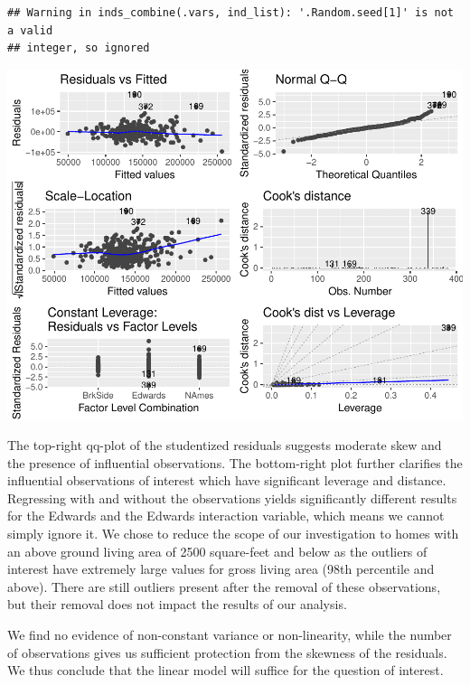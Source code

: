 \documentclass[american,]{article}
\begin{document}
\begin{verbatim}
## Warning in inds_combine(.vars, ind_list): '.Random.seed[1]' is not a valid
## integer, so ignored
\end{verbatim}

\includegraphics{HousePricesPaper_files/figure-latex/residualplot-1.pdf}

The top-right qq-plot of the studentized residuals suggests moderate
skew and the presence of influential observations. The bottom-right plot
further clarifies the influential observations of interest which have
significant leverage and distance. Regressing with and without the
observations yields significantly different results for the Edwards and
the Edwards interaction variable, which means we cannot simply ignore
it. We chose to reduce the scope of our investigation to homes with an
above ground living area of 2500 square-feet and below as the outliers
of interest have extremely large values for gross living area (98th
percentile and above). There are still outliers present after the
removal of these observations, but their removal does not impact the
results of our analysis.

We find no evidence of non-constant variance or non-linearity, while the
number of observations gives us sufficient protection from the skewness
of the residuals. We thus conclude that the linear model will suffice
for the question of interest.
\end{document}
